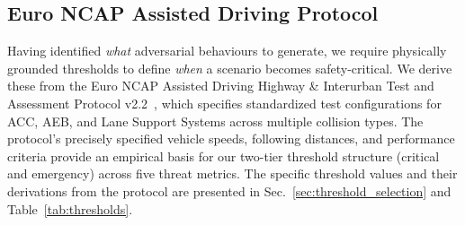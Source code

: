 \subsection{Euro NCAP Assisted Driving Protocol}\label{sec:euro_ncap}

Having identified \textit{what} adversarial behaviours to generate, we require physically grounded thresholds to define \textit{when} a scenario becomes safety-critical. We derive these from the Euro NCAP Assisted Driving Highway \& Interurban Test and Assessment Protocol v2.2~\cite{noauthor_euro_nodate}, which specifies standardized test configurations for ACC, AEB, and Lane Support Systems across multiple collision types. The protocol's precisely specified vehicle speeds, following distances, and performance criteria provide an empirical basis for our two-tier threshold structure (critical and emergency) across five threat metrics. The specific threshold values and their derivations from the protocol are presented in Sec.~\ref{sec:threshold_selection} and Table~\ref{tab:thresholds}.